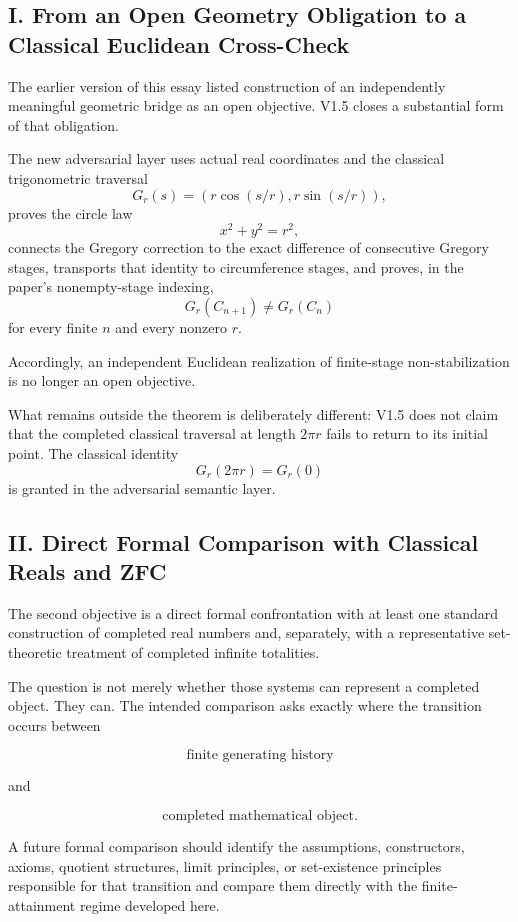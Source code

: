 \documentclass[11pt,a4paper]{article}
\begin{document}
\subsection{I. From an Open Geometry Obligation to a Classical Euclidean Cross-Check}

The earlier version of this essay listed construction of an
independently meaningful geometric bridge as an open objective.
V1.5 closes a substantial form of that obligation.

The new adversarial layer uses actual real coordinates and the
classical trigonometric traversal
\[
G_r(s)=
\left(
r\cos(s/r),
r\sin(s/r)
\right),
\]
proves the circle law
\[
x^2+y^2=r^2,
\]
connects the Gregory correction to the exact difference of consecutive
Gregory stages, transports that identity to circumference stages, and
proves, in the paper's nonempty-stage indexing,
\[
G_r(C_{n+1})\neq G_r(C_n)
\]
for every finite \(n\) and every nonzero \(r\).

Accordingly, an independent Euclidean realization of finite-stage
non-stabilization is no longer an open objective.

What remains outside the theorem is deliberately different: V1.5 does
not claim that the completed classical traversal at length $2\pi r$
fails to return to its initial point.  The classical identity
\[
G_r(2\pi r)=G_r(0)
\]
is granted in the adversarial semantic layer.


\subsection{II. Direct Formal Comparison with Classical Reals and ZFC}

The second objective is a direct formal confrontation with at least one
standard construction of completed real numbers and, separately, with a
representative set-theoretic treatment of completed infinite totalities.

The question is not merely whether those systems can represent a
completed object. They can. The intended comparison asks exactly where
the transition occurs between

\[
\text{finite generating history}
\]

and

\[
\text{completed mathematical object}.
\]

A future formal comparison should identify the assumptions, constructors,
axioms, quotient structures, limit principles, or set-existence
principles responsible for that transition and compare them directly
with the finite-attainment regime developed here.
\end{document}
